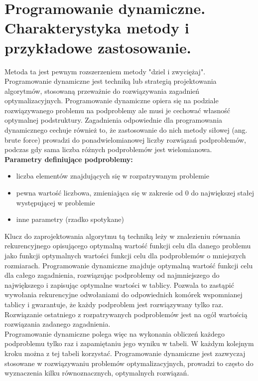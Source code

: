 \documentclass[10pt, a
4paper]{article}
\begin{document}
\newpage
\section{Programowanie dynamiczne. Charakterystyka metody i przykładowe zastosowanie.}
Metoda ta jest pewnym rozszerzeniem metody "dziel i zwyciężaj".\\
Programowanie dynamiczne jest techniką lub strategią projektowania algorytmów, stosowaną przeważnie do rozwiązywania zagadnień optymalizacyjnych. Programowanie dynamiczne opiera się na podziale rozwiązywanego problemu na podproblemy ale musi je cechować własność optymalnej podstruktury. Zagadnienia odpowiednie dla programowania dynamicznego cechuje również to, że zastosowanie do nich metody siłowej (ang. brute force) prowadzi do ponadwielomianowej liczby rozwiązań podproblemów, podczas gdy sama liczba różnych podproblemów jest wielomianowa.\\

\textbf{Parametry definiujące podproblemy:}
\begin{itemize}
\item liczba elementów znajdujących się w rozpatrywanym problemie
\item pewna wartość liczbowa, zmieniająca się w zakresie od 0 do największej stałej występującej w problemie
\item inne parametry (rzadko spotykane)
\end{itemize}

Klucz do zaprojektowania algorytmu tą techniką leży w znalezieniu równania rekurencyjnego opisującego optymalną wartość funkcji celu dla danego problemu jako funkcji optymalnych wartości funkcji celu dla podproblemów o mniejszych rozmiarach. Programowanie dynamiczne znajduje optymalną wartość funkcji celu dla całego zagadnienia, rozwiązując podproblemy od najmniejszego do największego i zapisując optymalne wartości w tablicy. Pozwala to zastąpić wywołania rekurencyjne odwołaniami do odpowiednich komórek wspomnianej tablicy i gwarantuje, że każdy podproblem jest rozwiązywany tylko raz. Rozwiązanie ostatniego z rozpatrywanych podproblemów jest na ogół wartością rozwiązania zadanego zagadnienia.\\
\indent Programowanie dynamiczne polega więc na wykonania obliczeń każdego podproblemu tylko raz i zapamiętaniu jego wyniku w tabeli. W każdym kolejnym kroku można z tej tabeli korzystać. Programowanie dynamiczne jest zazwyczaj stosowane w rozwiązywaniu problemów optymalizacyjnych, prowadzi to często do wyznaczenia kilku równoznacznych, optymalnych rozwiązań.
\end{document}
